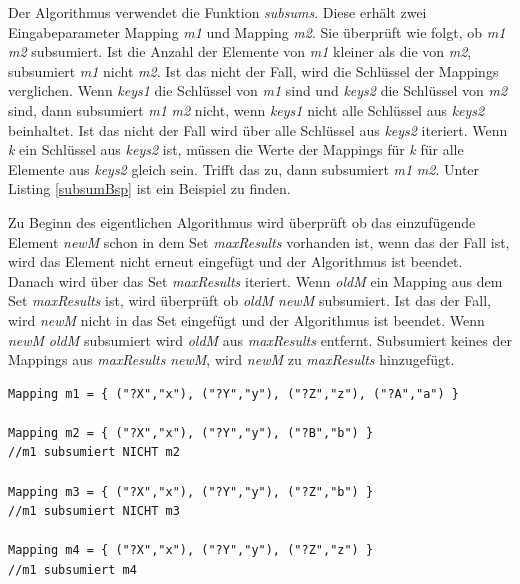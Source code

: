 \documentclass[draft,final]{vutinfth} %
\begin{document}
Der Algorithmus verwendet die Funktion \textit{subsums}. Diese erhält zwei Eingabeparameter Mapping \textit{m1} und Mapping \textit{m2}. Sie überprüft wie folgt, ob \textit{m1} \textit{m2} subsumiert. Ist die Anzahl der Elemente von \textit{m1} kleiner als die von \textit{m2}, subsumiert \textit{m1} nicht \textit{m2}. Ist das nicht der Fall, wird die Schlüssel der Mappings verglichen. Wenn \textit{keys1} die Schlüssel von \textit{m1} sind und \textit{keys2} die Schlüssel von \textit{m2} sind, dann subsumiert \textit{m1} \textit{m2} nicht, wenn \textit{keys1} nicht alle Schlüssel aus \textit{keys2} beinhaltet. Ist das nicht der Fall wird über alle Schlüssel aus \textit{keys2} iteriert. Wenn \textit{k} ein Schlüssel aus \textit{keys2} ist, müssen die Werte der Mappings für \textit{k} für alle Elemente aus \textit{keys2} gleich sein. Trifft das zu, dann subsumiert \textit{m1} \textit{m2}. Unter Listing \ref{subsumBsp} ist ein Beispiel zu finden. 

Zu Beginn des eigentlichen Algorithmus wird überprüft ob das einzufügende Element \textit{newM} schon in dem Set \textit{maxResults} vorhanden ist, wenn das der Fall ist, wird das Element nicht erneut eingefügt und der Algorithmus ist beendet. Danach wird über das Set \textit{maxResults} iteriert. Wenn \textit{oldM} ein Mapping aus dem Set \textit{maxResults} ist, wird überprüft ob \textit{oldM} \textit{newM} subsumiert. Ist das der Fall, wird \textit{newM} nicht in das Set eingefügt und der Algorithmus ist beendet. Wenn \textit{newM} \textit{oldM} subsumiert wird \textit{oldM} aus \textit{maxResults} entfernt. Subsumiert keines der Mappings aus \textit{maxResults} \textit{newM}, wird \textit{newM} zu \textit{maxResults} hinzugefügt.

\begin{lstlisting}[float,caption={Beispiel für Subsumierung},frame=single,label={subsumBsp}]
Mapping m1 = { ("?X","x"), ("?Y","y"), ("?Z","z"), ("?A","a") }

Mapping m2 = { ("?X","x"), ("?Y","y"), ("?B","b") }
//m1 subsumiert NICHT m2

Mapping m3 = { ("?X","x"), ("?Y","y"), ("?Z","b") }
//m1 subsumiert NICHT m3

Mapping m4 = { ("?X","x"), ("?Y","y"), ("?Z","z") }
//m1 subsumiert m4
\end{lstlisting}
\end{document}
